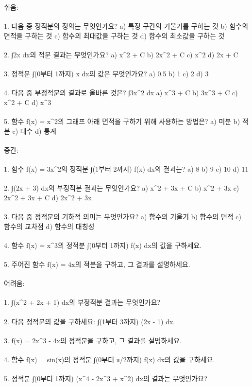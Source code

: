 \documentclass[fleqn]{article}
\begin{document}
      
        쉬움: \\\\  
1. 다음 중 정적분의 정의는 무엇인가요?  
   a) 특정 구간의 기울기를 구하는 것  
   b) 함수의 면적을 구하는 것  
   c) 함수의 최대값을 구하는 것  
   d) 함수의 최소값을 구하는 것 \\\\  

2. ∫2x dx의 적분 결과는 무엇인가요?  
   a) x^2 + C  
   b) 2x^2 + C  
   c) x^2  
   d) 2x + C \\\\  

3. 정적분 ∫(0부터 1까지) x dx의 값은 무엇인가요?  
   a) 0.5  
   b) 1  
   c) 2  
   d) 3 \\\\  

4. 다음 중 부정적분의 결과로 올바른 것은? ∫3x^2 dx  
   a) x^3 + C  
   b) 3x^3 + C  
   c) x^2 + C  
   d) x^3 \\\\  

5. 함수 f(x) = x^2의 그래프 아래 면적을 구하기 위해 사용하는 방법은?  
   a) 미분  
   b) 적분  
   c) 대수  
   d) 통계 \\\\  

중간: \\\\  
1. 함수 f(x) = 3x^2의 정적분 ∫(1부터 2까지) f(x) dx의 결과는?  
   a) 8  
   b) 9  
   c) 10  
   d) 11 \\\\  

2. ∫(2x + 3) dx의 부정적분 결과는 무엇인가요?  
   a) x^2 + 3x + C  
   b) x^2 + 3x  
   c) 2x^2 + 3x + C  
   d) 2x^2 + 3x \\\\  

3. 다음 중 정적분의 기하적 의미는 무엇인가요?  
   a) 함수의 기울기  
   b) 함수의 면적  
   c) 함수의 교차점  
   d) 함수의 대칭성 \\\\  

4. 함수 f(x) = x^3의 정적분 ∫(0부터 1까지) f(x) dx의 값을 구하세요. \\\\  

5. 주어진 함수 f(x) = 4x의 적분을 구하고, 그 결과를 설명하세요. \\\\  

어려움: \\\\  
1. ∫(x^2 + 2x + 1) dx의 부정적분 결과는 무엇인가요? \\\\  

2. 다음 정적분의 값을 구하세요: ∫(1부터 3까지) (2x - 1) dx. \\\\  

3. f(x) = 2x^3 - 4x의 정적분을 구하고, 그 결과를 설명하세요. \\\\  

4. 함수 f(x) = sin(x)의 정적분 ∫(0부터 π/2까지) f(x) dx의 값을 구하세요. \\\\  

5. 정적분 ∫(0부터 1까지) (x^4 - 2x^3 + x^2) dx의 결과는 무엇인가요? \\\\  

      
        
\end{document}
